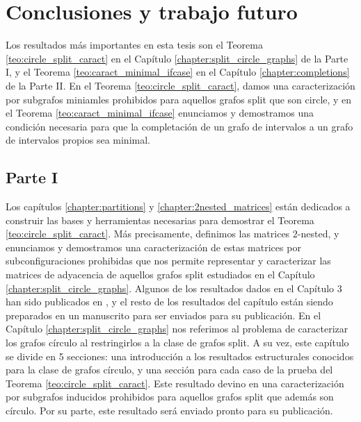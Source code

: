 \documentclass[12pt]{book}
\theoremstyle{plain}
\theoremstyle{remark}
\begin{document}

%
\chapter*{Conclusiones y trabajo futuro}

Los resultados más importantes en esta tesis son el Teorema \ref{teo:circle_split_caract} en el Capítulo \ref{chapter:split_circle_graphs} de la Parte I, y el Teorema \ref{teo:caract_minimal_ifcase} en el Capítulo \ref{chapter:completions} de la Parte II. En el Teorema \ref{teo:circle_split_caract}, damos una caracterización por subgrafos miniamles prohibidos para aquellos grafos split que son circle, y en el Teorema \ref{teo:caract_minimal_ifcase} enunciamos y demostramos una condición necesaria para que la completación de un grafo de intervalos a un grafo de intervalos propios sea minimal. 

\section*{Parte I}

Los capítulos \ref{chapter:partitions} y \ref{chapter:2nested_matrices} están dedicados a construir las bases y herramientas necesarias para demostrar el Teorema \ref{teo:circle_split_caract}.
Más precisamente, definimos las matrices $2$-nested, y enunciamos y demostramos una caracterización de estas matrices por subconfiguraciones prohibidas que nos permite representar y caracterizar las matrices de adyacencia de aquellos grafos split estudiados en el Capítulo \ref{chapter:split_circle_graphs}.
Algunos de los resultados dados en el Capítulo 3 han sido publicados en \cite{PDGS19}, y el resto de los resultados del capítulo están siendo preparados en un manuscrito para ser enviados para su publicación. 
En el Capítulo \ref{chapter:split_circle_graphs} nos referimos al problema de caracterizar los grafos círculo al restringirlos a la clase de grafos split. A su vez, este capítulo se divide en 5 secciones: una introducción a los resultados estructurales conocidos para la clase de grafos círculo, y una sección para cada caso de la prueba del Teorema \ref{teo:circle_split_caract}. Este resultado devino en una caracterización por subgrafos inducidos prohibidos para aquellos grafos split que además son círculo. Por su parte, este resultado será enviado pronto para su publicación. 
\end{document}
